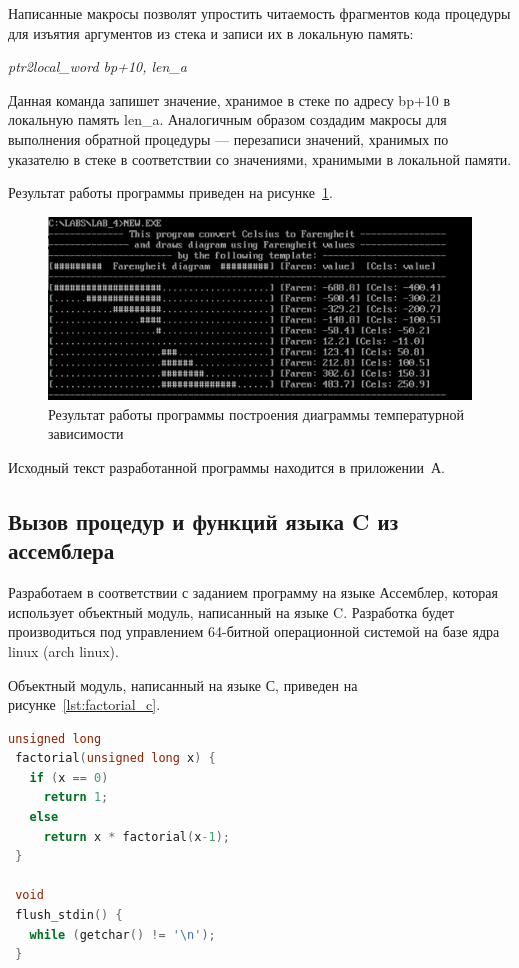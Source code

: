 Написанные макросы позволят упростить читаемость фрагментов кода процедуры
для изъятия аргументов из стека и записи их в локальную память:

\textit{ptr2local\_word bp+10, len\_a}

Данная команда запишет значение, хранимое в стеке по адресу bp+10 в локальную
память len\_a. Аналогичным образом создадим макросы для выполнения обратной
процедуры --- перезаписи значений, хранимых по указателю в стеке в соответствии
со значениями, хранимыми в локальной памяти.

Результат работы программы приведен на рисунке~\ref{pic:part_1}.

\begin{figure}[h!]
  \centering
  \includegraphics[width=0.8\linewidth]{pic/part_1}
  \caption{Результат работы программы построения диаграммы температурной зависимости}
  \label{pic:part_1}
\end{figure}

Исходный текст разработанной программы находится в приложении~А.

\subsection{Вызов процедур и функций языка C из ассемблера}

Разработаем в соответствии с заданием программу на языке Ассемблер, 
которая использует объектный модуль, написанный на языке C.
Разработка будет производиться под управлением 64-битной операционной системой 
на базе ядра linux (arch linux).

Объектный модуль, написанный на языке С, приведен на рисунке~\ref{lst:factorial_c}.

\begin{lstlisting}[caption=Исходный текст модуля на языке C,
label=lst:factorial_c,language={C},basicstyle=\scriptsize\ttfamily]
 unsigned long
 factorial(unsigned long x) {
   if (x == 0)
     return 1;
   else
     return x * factorial(x-1);
 }
 
 void
 flush_stdin() {
   while (getchar() != '\n');
 }
\end{lstlisting}

